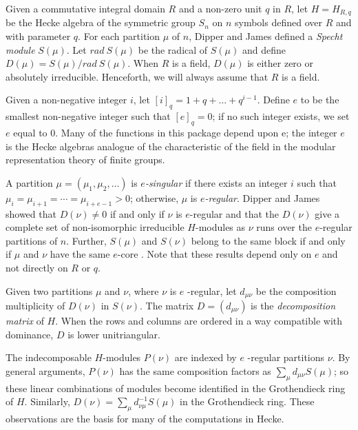 \documentclass[a4paper,11pt]{report}
\begin{document}
{{ Given a commutative integral domain $R$ and a non-zero unit $q$ in $R$, let $H=H_{R, q}$ be the Hecke algebra of the symmetric group $S_n$ on $n$ symbols defined over $R$ and with parameter $q$. For each partition $\mu$ of $n$, Dipper and James defined a \emph{Specht module} $S(\mu)$. Let $rad~S(\mu)$ be the radical of $S(\mu)$ and define $D(\mu)=S(\mu)/rad~S(\mu)$. When $R$ is a field, $D(\mu)$ is either zero or absolutely irreducible. Henceforth, we will always assume
that $R$ is a field.

 Given a non-negative integer $i$, let $[i]_q=1+q+\ldots+q^{i-1}$. Define $e$ to be the smallest non-negative integer such that $[e]_q=0$; if no such integer exists, we set $e$ equal to $0$. Many of the functions in this package depend upon e; the integer $e$ is the Hecke algebras analogue of the characteristic of the field in the
modular representation theory of finite groups.

 A partition $\mu=(\mu_1,\mu_2,\ldots)$ is \emph{$e$-singular} if there exists an integer $i$ such that $\mu_i=\mu_{i+1}=\cdots= \mu_{i+e-1}>0$; otherwise, $\mu$ is \emph{$e$-regular}. Dipper and James \cite{DJ1} showed that $D(\nu)\neq 0$ if and only if $\nu$ is $e$-regular and that the $D(\nu)$ give a complete set of non-isomorphic irreducible $H$-modules as $\nu$ runs over the $e$-regular partitions of $n$. Further, $S(\mu)$ and $S(\nu)$ belong to the same block if and only if $\mu$ and $\nu$ have the same $e$-core \cite{DJ2}\cite{JM2}. Note that these results depend only on $e$ and not directly on $R$ or $q$.

 Given two partitions $\mu$ and $\nu$, where $\nu$ is $e$ -regular, let $d_{\mu\nu}$ be the composition multiplicity of $D(\nu)$ in $S(\nu)$. The matrix $D=(d_{\mu\nu})$ is the \emph{ decomposition matrix} of $H$. When the rows and columns are ordered in a way compatible with dominance, $D$ is lower unitriangular.

 The indecomposable $H$-modules $P(\nu)$ are indexed by $e$ -regular partitions $\nu$. By general arguments, $P(\nu)$ has the same composition factors as $\sum_{\mu} d_{\mu\nu} S(\mu)$; so these linear combinations of modules become identified in the
Grothendieck ring of $H$. Similarly, $D(\nu) = \sum_{\mu} d_{\nu\mu}^{-1} S(\mu)$ in the Grothendieck ring. These observations are the basis for many of the
computations in \textsf{Hecke}. }

 
}
\end{document}
